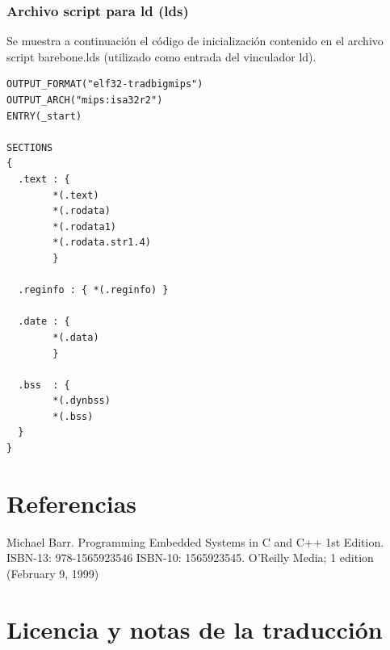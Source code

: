 \documentclass[output=paper, 
colorlinks,
citecolor=brown,
newtxmath
]{langscibook}
\begin{document}
\subsubsection {Archivo script para ld (lds)}

Se muestra a continuación el código de inicialización contenido en el archivo
script barebone.lds (utilizado como entrada del vinculador ld). 

\begin{verbatim}
OUTPUT_FORMAT("elf32-tradbigmips")
OUTPUT_ARCH("mips:isa32r2")
ENTRY(_start)

SECTIONS
{
  .text : {
        *(.text)
        *(.rodata)
        *(.rodata1)
        *(.rodata.str1.4)
        }

  .reginfo : { *(.reginfo) }

  .date : {
        *(.data)
        }

  .bss  : {
        *(.dynbss)
        *(.bss)
  }
}
\end{verbatim}


\pagebreak

\section{Referencias}

Michael Barr. Programming Embedded Systems in C and C++ 1st Edition. ISBN-13: 978-1565923546
ISBN-10: 1565923545. O'Reilly Media; 1 edition (February 9, 1999)


\section*{Licencia y notas de la traducción}
\end{document}
